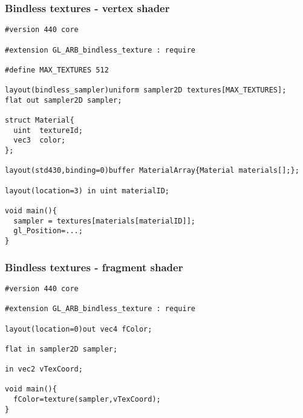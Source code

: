 \begin{frame}[fragile]
\frametitle{Bindless textures - vertex shader}
{\scriptsize
\begin{verbatim}
#version 440 core

#extension GL_ARB_bindless_texture : require

#define MAX_TEXTURES 512

layout(bindless_sampler)uniform sampler2D textures[MAX_TEXTURES];
flat out sampler2D sampler;

struct Material{
  uint  textureId;
  vec3  color;
};

layout(std430,binding=0)buffer MaterialArray{Material materials[];};

layout(location=3) in uint materialID;

void main(){
  sampler = textures[materials[materialID]];
  gl_Position=...;
}
\end{verbatim}
}
\end{frame}

\begin{frame}[fragile]
\frametitle{Bindless textures - fragment shader}
{\scriptsize
\begin{verbatim}
#version 440 core

#extension GL_ARB_bindless_texture : require

layout(location=0)out vec4 fColor;

flat in sampler2D sampler;

in vec2 vTexCoord;

void main(){
  fColor=texture(sampler,vTexCoord);
}
\end{verbatim}
}
\end{frame}


